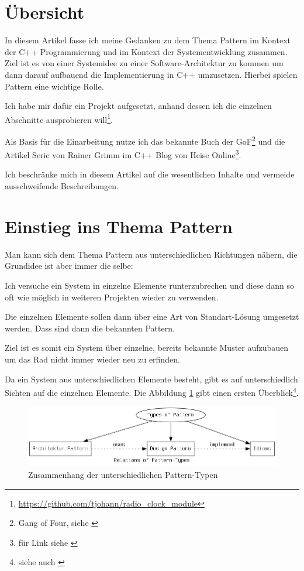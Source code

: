 \documentclass[a4paper, 12pt] {article}
\begin{document}
\pagestyle{headings}

\tableofcontents

\section{Übersicht}
In diesem Artikel fasse ich meine Gedanken zu dem Thema Pattern im Kontext der C++ Programmierung und im Kontext der Systementwicklung zusammen. Ziel ist es von einer Systemidee zu einer Software-Architektur zu kommen um dann darauf aufbauend die Implementierung in C++ umzusetzen. Hierbei spielen Pattern eine wichtige Rolle.

Ich habe mir dafür ein Projekt aufgesetzt, anhand dessen ich die einzelnen Abschnitte ausprobieren will\footnote{\url{https://github.com/tjohann/radio_clock_module}}.

Als Basis für die Einarbeitung nutze ich das bekannte Buch der GoF\footnote{Gang of Four, siehe \cite{gof}} und die Artikel Serie von Rainer Grimm im C++ Blog von Heise Online\footnote{für Link siehe \cite{grimm1}}.

Ich beschränke mich in diesem Artikel auf die wesentlichen Inhalte und vermeide ausschweifende Beschreibungen.

\section{Einstieg ins Thema Pattern}

Man kann sich dem Thema Pattern aus unterschiedlichen Richtungen nähern, die Grundidee ist aber immer die selbe:

Ich versuche ein System in einzelne Elemente runterzubrechen und diese dann so oft wie möglich in weiteren Projekten wieder zu verwenden.

Die einzelnen Elemente sollen dann über eine Art von Standart-Lösung umgesetzt werden. Dass sind dann die bekannten Pattern.

Ziel ist es somit ein System über einzelne, bereits bekannte Muster aufzubauen um das Rad nicht immer wieder neu zu erfinden.

Da ein System aus unterschiedlichen Elemente besteht, gibt es auf unterschiedlich Sichten auf die einzelnen Elemente. Die Abbildung \ref{overview_pattern1} gibt einen ersten Überblick\footnote{siehe auch \cite{grimm1}}.

\begin{figure}[h!]
\begin{center}
  \includegraphics[width=15cm] {overview.png}
  \caption{Zusammenhang der unterschiedlichen Pattern-Typen}
  \label{overview_pattern1}
\end{center}
\end{figure}
\end{document}
